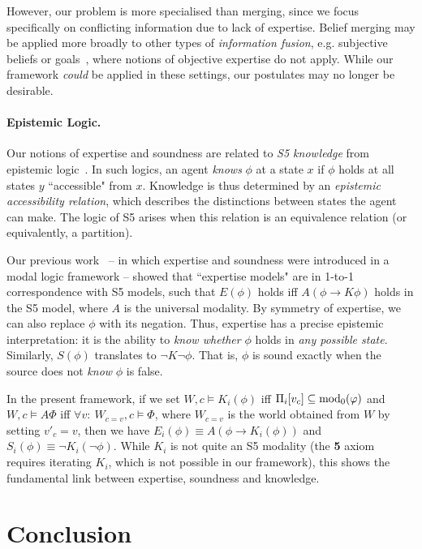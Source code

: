 However, our problem is more specialised than merging, since we focus
specifically on conflicting information due to lack of expertise. Belief
merging may be applied more broadly to other types of \emph{information
fusion}, e.g. subjective beliefs or goals~\cite{gregoire_fusion_2006},
where notions of objective expertise do not apply. While our framework
\emph{could} be applied in these settings, our postulates may no longer be
desirable.

\paragraph{Epistemic Logic.}

Our notions of expertise and soundness are related to \emph{S5
knowledge} from epistemic logic~\cite{handbook_epistemic}. In such
logics, an agent \emph{knows} $\phi$ at a state $x$ if $\phi$ holds at all
states $y$ ``accessible" from $x$. Knowledge is thus determined by an
\emph{epistemic accessibility relation}, which describes the distinctions
between states the agent can make. The logic of S5 arises when this relation is an
equivalence relation (or equivalently, a partition).

Our previous work~\cite{singleton2021logic} -- in which expertise and soundness
were introduced in a modal logic framework -- showed that ``expertise
models" are in 1-to-1 correspondence with S5 models, such that $E(\phi)$
holds iff $A(\phi \rightarrow K\phi)$ holds in the S5 model, where $A$ is the
universal modality. By symmetry of expertise, we can also replace $\phi$ with
its negation. Thus, expertise has a precise epistemic interpretation: it is the
ability to \emph{know whether} $\phi$ holds in \emph{any possible state}.
Similarly, $S(\phi)$ translates to $\neg K \neg \phi$. That is, $\phi$ is sound
exactly when the source does not \emph{know} $\phi$ is false.

In the present framework, if we set
%
$W, c \models K_i(\phi)$ iff $\Pi_i[v_c] \subseteq \operatorname{mod}_0(\varphi)$ and
%
$W, c \models A\Phi$ iff $\forall v:\ W_{c=v}, c \models \Phi$,
%
where $W_{c=v}$ is the world obtained from $W$ by setting $v'_c = v$, then we
have $E_i(\phi) \equiv A(\phi \rightarrow K_i(\phi))$ and $S_i(\phi) \equiv
\neg K_i(\neg \phi)$. While $K_i$ is not quite an S5 modality (the \textbf{5}
axiom requires iterating $K_i$, which is not possible in our framework), this
shows the fundamental link between expertise, soundness and knowledge.

\section{Conclusion}
\label{sec:conclusion}

